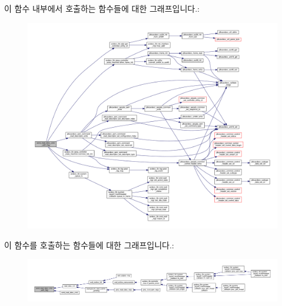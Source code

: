 이 함수 내부에서 호출하는 함수들에 대한 그래프입니다.\+:
\nopagebreak
\begin{figure}[H]
\begin{center}
\leavevmode
\includegraphics[width=350pt]{classavdecc__lib_1_1end__station__imp_af43caa2c31793407160890148e877b06_cgraph}
\end{center}
\end{figure}




이 함수를 호출하는 함수들에 대한 그래프입니다.\+:
\nopagebreak
\begin{figure}[H]
\begin{center}
\leavevmode
\includegraphics[width=350pt]{classavdecc__lib_1_1end__station__imp_af43caa2c31793407160890148e877b06_icgraph}
\end{center}
\end{figure}


